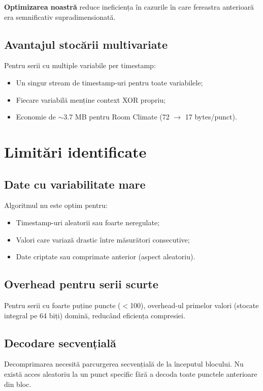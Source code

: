 \textbf{Optimizarea noastră} reduce ineficiența în cazurile în care fereastra anterioară era semnificativ supradimensionată.

\subsection{Avantajul stocării multivariate}

Pentru serii cu multiple variabile per timestamp:
\begin{itemize}
    \item Un singur stream de timestamp-uri pentru toate variabilele;
    \item Fiecare variabilă menține context XOR propriu;
    \item Economie de $\sim$3.7 MB pentru Room Climate (72 $\rightarrow$ 17 bytes/punct).
\end{itemize}

\section{Limitări identificate}

\subsection{Date cu variabilitate mare}

Algoritmul nu este optim pentru:
\begin{itemize}
    \item Timestamp-uri aleatorii sau foarte neregulate;
    \item Valori care variază drastic între măsurători consecutive;
    \item Date criptate sau comprimate anterior (aspect aleatoriu).
\end{itemize}

\subsection{Overhead pentru serii scurte}

Pentru serii cu foarte puține puncte ($<$100), overhead-ul primelor valori (stocate integral pe 64 biți) domină, reducând eficiența compresiei.

\subsection{Decodare secvențială}

Decomprimarea necesită parcurgerea secvențială de la începutul blocului. Nu există acces aleatoriu la un punct specific fără a decoda toate punctele anterioare din bloc.

